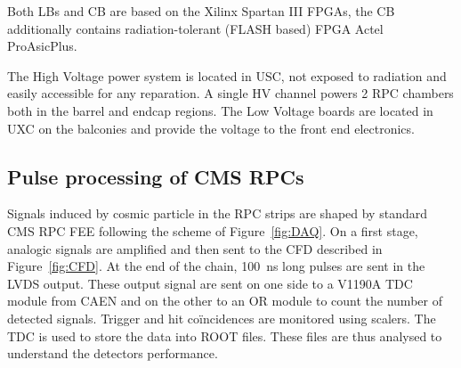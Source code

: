 	Both LBs and CB are based on the Xilinx Spartan III FPGAs, the CB additionally contains radiation-tolerant (FLASH based) FPGA Actel ProAsicPlus.

	The High Voltage power system is located in USC, not exposed to radiation and easily accessible for any reparation. A single HV channel powers 2 RPC chambers both in the barrel and endcap regions. The Low Voltage boards are located in UXC on the balconies and provide the voltage to the front end electronics.

    \subsection{Pulse processing of CMS RPCs}
    \label{ssec:PulseProc}
	
		Signals induced by cosmic particle in the RPC strips are shaped by standard CMS RPC \acf{FEE} following the scheme of Figure~\ref{fig:DAQ}. On a first stage, analogic signals are amplified and then sent to the \acf{CFD} described in Figure~\ref{fig:CFD}. At the end of the chain, \SI{100}{ns} long pulses are sent in the LVDS output. These output signal are sent on one side to a V1190A \acf{TDC} module from CAEN and on the other to an OR module to count the number of detected signals. Trigger and hit coïncidences are monitored using scalers. The TDC is used to store the data into ROOT files. These files are thus analysed to understand the detectors performance.

